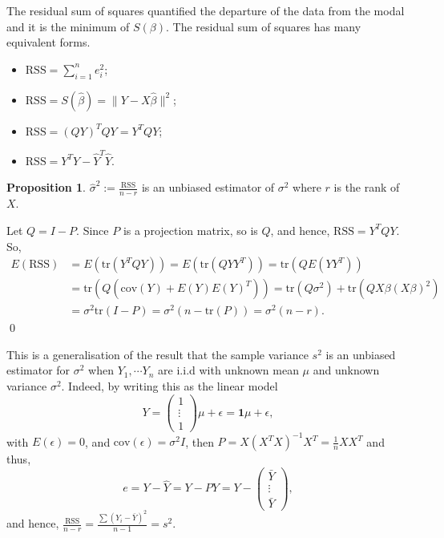 \documentclass[
]{article}
\theoremstyle{definition}
\newtheorem{prop}{Proposition}
\theoremstyle{definition}
\begin{document}
The residual sum of squares quantified the departure of the data from
the modal and it is the minimum of \(S(\beta)\). The residual sum of
squares has many equivalent forms.

\begin{itemize}
  \item \(\text{RSS} = \sum_{i = 1}^n e_i^2\);
  \item \(\text{RSS} = S(\hat \beta) = \| Y - X \hat \beta\|^2\);
  \item \(\text{RSS} = (QY)^T QY = Y^T Q Y\);
  \item \(\text{RSS} = Y^T Y - \hat Y^T \hat Y\).
\end{itemize}

\begin{prop}
  \(\hat \sigma^2 := \frac{\text{RSS}}{n - r}\) is an unbiased estimator of \(\sigma^2\) 
  where \(r\) is the rank of \(X\).
\end{prop}
\proof

Let \(Q = I - P\). Since \(P\) is a projection matrix, so is \(Q\), and
hence, \(\text{RSS} = Y^T Q Y\). So, \[\begin{split}
    E(\text{RSS}) & = E(\text{tr}(Y^T Q Y)) = E(\text{tr}(QYY^T)) = \text{tr}(QE(YY^T))\\
    & = \text{tr}(Q(\text{cov}(Y) + E(Y)E(Y)^T)) = 
      \text{tr}(Q \sigma^2) + \text{tr}(QX\beta (X\beta)^2)\\
    & = \sigma^2\text{tr}(I - P) = \sigma^2 (n - \text{tr}(P)) = \sigma^2(n - r).
  \end{split}\] \qed

This is a generalisation of the result that the sample variance \(s^2\)
is an unbiased estimator for \(\sigma^2\) when \(Y_1, \cdots Y_n\) are
i.i.d with unknown mean \(\mu\) and unknown variance \(\sigma^2\).
Indeed, by writing this as the linear model \[Y = \begin{pmatrix}
  1 \\ \vdots \\ 1
\end{pmatrix}\mu + \epsilon = \mathbf{1} \mu + \epsilon,\] with
\(E(\epsilon) = 0\), and \(\text{cov}(\epsilon) = \sigma^2 I\), then
\(P = X(X^T X)^{-1}X^T = \frac{1}{n}XX^T\) and thus,
\[e = Y - \hat Y = Y - PY = Y - \begin{pmatrix}
  \bar Y \\ \vdots\\ \bar Y
\end{pmatrix},\] and hence,
\(\frac{\text{RSS}}{n - r} = \frac{\sum(Y_i - \bar Y)^2}{n - 1} = s^2\).
\end{document}
